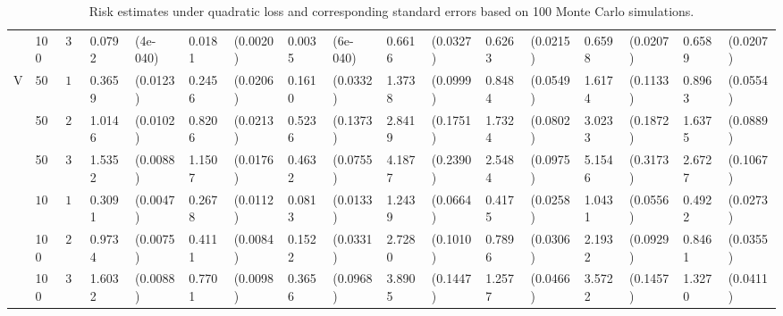 \begin{landscape}
\begin{table}[H]
\begin{footnotesize}
\begin{tabular}{lllllllllllllllll}
    & 100  & $30$ & 0.0792 & (4e-040) & 0.0181 & (0.0020) & 0.0035 & (6e-040) & 0.6616 & (0.0327) & 0.6263 & (0.0215) & 0.6598 & (0.0207) & 0.6589 & (0.0207) \\ 
  V & $50$ & $10$ & 0.3659 & (0.0123) & 0.2456 & (0.0206) & 0.1610 & (0.0332) & 1.3738 & (0.0999) & 0.8484 & (0.0549) & 1.6174 & (0.1133) & 0.8963 & (0.0554) \\ 
    & 50  & $20$ & 1.0146 & (0.0102) & 0.8206 & (0.0213) & 0.5236 & (0.1373) & 2.8419 & (0.1751) & 1.7324 & (0.0802) & 3.0233 & (0.1872) & 1.6375 & (0.0889) \\ 
    &  50 & $30$ & 1.5352 & (0.0088) & 1.1507 & (0.0176) & 0.4632 & (0.0755) & 4.1877 & (0.2390) & 2.5484 & (0.0975) & 5.1546 & (0.3173) & 2.6727 & (0.1067) \\ 
    & $100$ & $10$ & 0.3091 & (0.0047) & 0.2678 & (0.0112) & 0.0813 & (0.0133) & 1.2439 & (0.0664) & 0.4175 & (0.0258) & 1.0431 & (0.0556) & 0.4922 & (0.0273) \\ 
    &  100 & $20$ & 0.9734 & (0.0075) & 0.4111 & (0.0084) & 0.1522 & (0.0331) & 2.7280 & (0.1010) & 0.7896 & (0.0306) & 2.1932 & (0.0929) & 0.8461 & (0.0355) \\ 
    &  100 & $30$ & 1.6032 & (0.0088) & 0.7701 & (0.0098) & 0.3656 & (0.0968) & 3.8905 & (0.1447) & 1.2577 & (0.0466) & 3.5722 & (0.1457) & 1.3270 & (0.0411) \\ 
   \hline
\end{tabular}
\caption{Risk estimates under quadratic loss and corresponding standard errors based on
                              100 Monte Carlo simulations.} \label{table:master-quadratic-risk-table}
\end{footnotesize}
\end{table}
\end{landscape}


